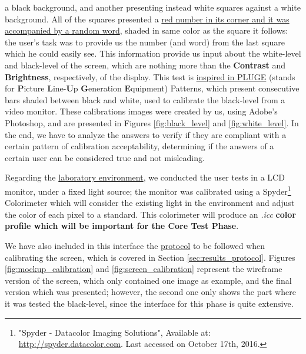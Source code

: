 a black background, and another presenting instead white squares against a white background. All of the squares presented a \ul{red number in its
corner and it was accompanied by a random word}, shaded in same color as the square it follows: the user's task was to provide us the number (and
word) from the last square which he could easily see. This information provide us input about the white-level and black-level of the screen, which
are nothing more than the \textbf{Contrast} and \textbf{Brightness}, respectively, of the display. This test is \ul{inspired in PLUGE} (stands for \textbf{P}icture
\textbf{L}ine-\textbf{U}p \textbf{G}eneration \textbf{E}quipment) Patterns, which present consecutive bars shaded between black and white, used to calibrate the black-level from a video
monitor. These calibrations images were created by us, using Adobe's Photoshop, and are presented in Figures \ref{fig:black_level} and
\ref{fig:white_level}. In the end, we have to analyze the answers to verify if they are compliant with a certain pattern of calibration acceptability,
determining if the answers of a certain user can be considered true and not misleading. \par
%
Regarding the \ul{laboratory environment}, we conducted the user tests in a LCD monitor, under a fixed light source; the monitor was calibrated
using a Spyder\footnote{"Spyder - Datacolor Imaging Solutions", Available at: \url{http://spyder.datacolor.com}. Last accessed on October 17th, 2016.}
Colorimeter which will consider the existing light in the environment and adjust the color of each pixel to a standard. This colorimeter will produce an
\emph{.icc} \textbf{color profile which will be important for the Core Test Phase}. \par
%
We have also included in this interface the \ul{protocol} to be followed when calibrating the screen, which is covered in Section \ref{sec:results_protocol}.
Figures \ref{fig:mockup_calibration} and \ref{fig:screen_calibration} represent the wireframe version of the screen, which only contained one image as
example, and the final version which was presented; however, the second one only shows the part where it was tested the black-level, since the interface
for this phase is quite extensive. \par
%
